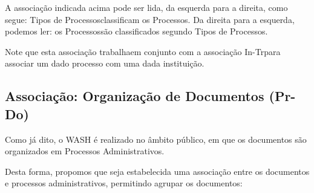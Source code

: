 \documentclass[
12pt,		%
openright,	%
twoside,  %
a4paper,			%
chapter=TITLE,		%
english,			%
french,				%
spanish,			%
brazil				%
]{USPSC-classe/USPSC}
\begin{document}

A associa\c{c}\~ao indicada acima pode ser lida, da esquerda para a direita, como segue: \textquotedbl Tipos de Processos\textquotedbl  classificam os \textquotedbl Processos\textquotedbl . Da direita para a esquerda, podemos ler: os \textquotedbl Processos\textquotedbl  s\~ao classificados segundo \textquotedbl Tipos de Processos\textquotedbl .









Note que esta associa\c{c}\~ao \textquotedbl trabalha\textquotedbl  em conjunto com a associa\c{c}\~ao \textquotedbl In-Tr\textquotedbl  para associar um dado processo com uma dada institui\c{c}\~ao.









\subsection[Associa\c{c}\~ao: Organiza\c{c}\~ao de Documentos (Pr-Do)]{Associa\c{c}\~ao: Organiza\c{c}\~ao de Documentos (Pr-Do)}\label{Associa\c{c}\~ao: Organiza\c{c}\~ao de Documentos (Pr-Do)}
Como j\'a dito, o WASH \'e realizado no \^ambito p\'ublico, em que os documentos s\~ao organizados em Processos Administrativos.









Desta forma, propomos que seja estabelecida uma associa\c{c}\~ao entre os documentos e processos administrativos, permitindo agrupar os documentos:










\end{document}
